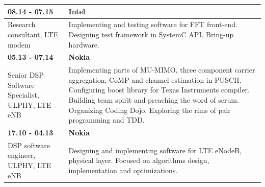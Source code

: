 \documentclass{report}
\begin{document}
\begin{longtable}{p{5cm} p{10cm}}
    \textbf{08.14 - 07.15} &\textbf{Intel}\\
    \hline
    Research consultant, LTE modem
    &Implementing and testing software for FFT front-end. Designing test framework in SystemC
    API. Bring-up hardware.\\

    \textbf{05.13 - 07.14} &\textbf{Nokia}\\
    \hline
    Senior DSP Software Specialist, ULPHY, LTE eNB
    &Implementing parts of MU-MIMO, three component carrier aggregation, CoMP
    and channel estimation in PUSCH. Configuring boost library for Texas
    Instruments compiler. Building team spirit and preaching the word of scrum.
    Organizing Coding Dojo. Exploring the rims of pair programming and TDD.\\

    \textbf{17.10 - 04.13} &\textbf{Nokia}\\
    \hline
    DSP software engineer, ULPHY, LTE eNB
    &Designing and implementing software for LTE eNodeB, physical layer.
    Focused on algorithms design, implementation and optimizations.\\
\end{longtable}
\end{document}
